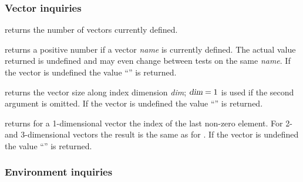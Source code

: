 \ifVECTOR

\subsubsection{Vector inquiries}

\begin{UL}

\item
{} returns the number of vectors currently defined.

\item
{} returns a positive number if a vector
\textsl{name} is currently defined.
The actual value returned is undefined and may even change between
tests on the same \textsl{name}.
If the vector is undefined the value ``'' is returned.

\item
{} returns the vector
size along index dimension \textsl{dim};
$\textsl{dim}=1$ is used if the second argument is omitted.
If the vector is undefined the value ``'' is returned.

\item
{} returns for a 1-dimensional vector the index of the last non-zero element. 
For 2- and 3-dimensional vectors the result is the same as for .
If the vector is undefined the value ``'' is returned.

\end{UL}


\fi%


\subsubsection{Environment inquiries}

